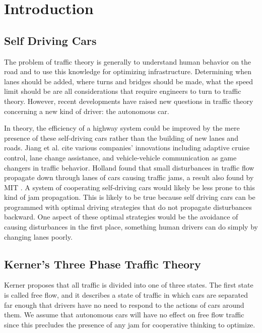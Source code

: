 \chapter{Introduction}
\thispagestyle{fancy} %
\section{Self Driving Cars}

The problem of traffic theory is generally to understand human behavior on the road and to use this knowledge for optimizing infrastructure. Determining when lanes should be added, where turns and bridges should be made, what the speed limit should be are all considerations that require engineers to turn to traffic theory. However, recent developments have raised new questions in traffic theory concerning a new kind of driver: the autonomous car. 

In theory, the efficiency of a highway system could be improved by the mere presence of these self-driving cars rather than the building of new lanes and roads. Jiang et al. \cite{jiang} cite various companies’ innovations including adaptive cruise control, lane change assistance, and vehicle-vehicle communication as game changers in traffic behavior.
Holland \cite{holland} found that small disturbances in traffic flow propagate down through lanes of cars causing traffic jams, a result also found by MIT \cite{mit}. A system of cooperating self-driving cars would likely be less prone to this kind of jam propagation. This is likely to be true because self driving cars can be programmed with optimal driving strategies that do not propagate disturbances backward. One aspect of these optimal strategies would be the avoidance of causing disturbances in the first place, something human drivers can do simply by changing lanes poorly.

\section{Kerner’s Three Phase Traffic Theory}
Kerner \cite{kerner} proposes that all traffic is divided into one of three states. The first state is called free flow, and it describes a state of traffic in which cars are separated far enough that drivers have no need to respond to the actions of cars around them. We assume that autonomous cars will have no effect on free flow traffic since this precludes the presence of any jam for cooperative thinking to optimize. 

